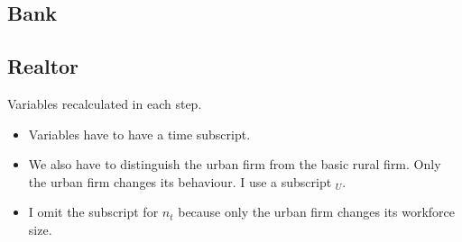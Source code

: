 \subsection{Bank}
\subsection{Realtor}
Variables recalculated in each step. 
\begin{itemize}
    \item Variables have to have a time subscript. 
    \item We also have to distinguish the urban firm from the basic rural firm.  Only the urban firm changes its behaviour.  I use a subscript $_U$. 
    \item I omit the subscript for $n_t$ because only the urban firm changes its workforce size.
\end{itemize}

